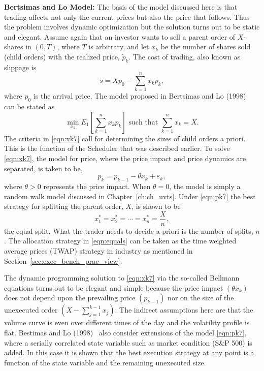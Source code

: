 \noindent\textbf{Bertsimas and Lo Model:}\label{in:bert_lo} The basis of the model discussed here is that trading affects not only the current prices but also the price that follows. Thus the problem involves dynamic optimization but the solution turns out to be static and elegant. Assume again that an investor wants to sell a parent order of $X$-shares in $(0,T)$, where $T$ is arbitrary, and let $x_k$ be the number of shares sold (child orders) with the realized price, $\widetilde{p}_k$. The cost of trading, also known as slippage is
	\begin{equation} \label{eqn:x7}
	s= Xp_0 - \sum_{k=1}^n x_k\widetilde{p}_k,
	\end{equation}
where $p_0$ is the arrival price. The model proposed in Bertsimas and Lo (1998)~\cite{berlo} can be stated as
	\begin{equation} \label{eqn:xk7}
	\min_{x_k} E_1 \left[\sum_{k=1}^n x_kp_k\right] \text{ such that }\sum_{k=1}^n x_k=X.
	\end{equation}
The criteria in \eqref{eqn:xk7} call for determining the sizes of child orders a priori. This is the function of the Scheduler that was described earlier. To solve \eqref{eqn:xk7}, the model for price, where the price impact and price dynamics are separated, is taken to be,
	\begin{equation} \label{eqn:pk7}
	p_k = p_{k-1} - \theta x_k + \varepsilon_k,
	\end{equation}
where $\theta > 0$ represents the price impact. When $\theta = 0$, the model is simply a random walk model discussed in Chapter~\ref{ch:ch_uvts}. Under \eqref{eqn:pk7} the best strategy for splitting the parent order, $X$, is shown to be
	\begin{equation} \label{eqn:equals}
	x_1^* = x_2^* = \cdots = x_n^* = \frac{X}{n},
	\end{equation}
the equal split. What the trader needs to decide a priori is the number of splits, $n$. The allocation strategy in \eqref{eqn:equals} can be taken as the time weighted average prices (TWAP) strategy in industry as mentioned in Section~\ref{sec:exec_bench_prac_view}.


The dynamic programming solution to \eqref{eqn:xk7} via the so-called Bellmann equations turns out to be elegant and simple because the price impact $(\theta x_k)$ does not depend upon the prevailing price $(p_{k-1})$ nor on the size of the unexecuted order $(X - \sum_{j=1}^{k-1} x_j)$. The indirect assumptions here are that the volume curve is even over different times of the day and the volatility profile is flat. Bestimas and Lo (1998)~\cite{berlo} also consider extensions of the model \eqref{eqn:pk7}, where a serially correlated state variable such as market condition (S\&P 500) is added. In this case it is shown that the best execution strategy at any point is a function of the state variable and the remaining unexecuted size. 


